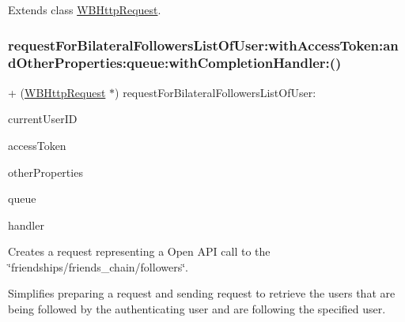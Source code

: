 Extends class \mbox{\hyperlink{interface_w_b_http_request_a5c4b501746e378232db99ae045e49889}{W\+B\+Http\+Request}}.

\mbox{\label{category_w_b_http_request_07_weibo_user_08_a5c4b501746e378232db99ae045e49889}} 
\subsubsection{\texorpdfstring{request\+For\+Bilateral\+Followers\+List\+Of\+User\+:with\+Access\+Token\+:and\+Other\+Properties\+:queue\+:with\+Completion\+Handler\+:()}{requestForBilateralFollowersListOfUser:withAccessToken:andOtherProperties:queue:withCompletionHandler:()}\hspace{0.1cm}{\footnotesize\ttfamily [3/3]}}
{\footnotesize\ttfamily + (\mbox{\hyperlink{interface_w_b_http_request}{W\+B\+Http\+Request}} $\ast$) request\+For\+Bilateral\+Followers\+List\+Of\+User\+: \begin{DoxyParamCaption}\item[{(N\+S\+String $\ast$)}]{current\+User\+ID }\item[{withAccessToken:(N\+S\+String $\ast$)}]{access\+Token }\item[{andOtherProperties:(N\+S\+Dictionary $\ast$)}]{other\+Properties }\item[{queue:(N\+S\+Operation\+Queue $\ast$)}]{queue }\item[{withCompletionHandler:(W\+B\+Request\+Handler)}]{handler }\end{DoxyParamCaption}}

Creates a request representing a Open A\+PI call to the \char`\"{}friendships/friends\+\_\+chain/followers\char`\"{}.

Simplifies preparing a request and sending request to retrieve the users that are being followed by the authenticating user and are following the specified user.

